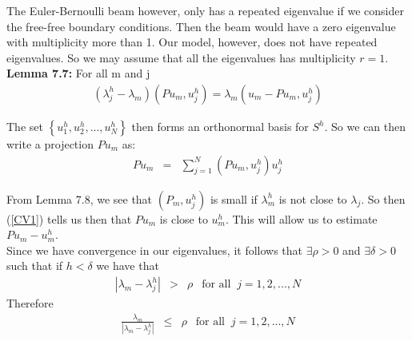 \documentclass[../../main.tex]{subfiles}
\begin{document}
The Euler-Bernoulli beam however, only has a repeated eigenvalue if we consider the free-free boundary conditions. Then the beam would have a zero eigenvalue with multiplicity more than 1. Our model, however, does not have repeated eigenvalues. So we may assume that all the eigenvalues has multiplicity $r=1$.\\


\textbf{Lemma 7.7:} For all m and j
\begin{eqnarray*}
(\lambda_{j}^{h} - \lambda_{m}) ( Pu_{m}, u_{j}^{h}) = \lambda_{m} ( u_{m}-Pu_{m},u_{j}^{h} )
\end{eqnarray*}

\begin{comment}
\textbf{Proof:}
Since the term $\lambda_{m}( Pu,u^{h}_{j})$ appears on both sides of the equation, it is only required to show that
\begin{eqnarray*}
\lambda_{j}^{h}( Pu, u_{j}^{h} ) &=& \lambda_{m} ( u, u_{j}^{h} )
\end{eqnarray*}
Now
\begin{eqnarray*}
\lambda_{j}^{h}( Pu, u_{j}^{h} ) &=& b(Pu,u_{j}^{h})\\
\lambda_{m} ( u, u_{j}^{h} ) &=& b(u,u_{j}^{h})
\end{eqnarray*} Since $u$ and $u_{j}^{h}$ are both eigenfunctions.\\


Then equality follows from the definitions of the projection P.
\qed
\end{comment}

The set $\left\{u_{1}^{h},u_{2}^{h},...,u_{N}^{h}\right\}$ then forms an orthonormal basis for $S^{h}$. So we can then write a projection $Pu_{m}$ as:
\begin{eqnarray}
Pu_{m} &=& \sum_{j=1}^{N} ( P u_{m} ,u_{j}^{h}) u_{j}^{h} \label{CV1}
\end{eqnarray}


From Lemma 7.8, we see that $( P_{m},u_{j}^{h} )$ is small if $\lambda_{m}^{h}$ is not close to $\lambda_{j}$. So then (\ref{CV1}) tells us then that $Pu_{m}$ is close to $u_{m}^{h}$. This will allow us to estimate $Pu_{m} - u_{m}^{h}$.\\


Since we have convergence in our eigenvalues, it follows that $\exists \rho > 0$ and $\exists \delta > 0$ such that if $h<\delta$ we have that
\begin{eqnarray}
|\lambda_{m} - \lambda_{j}^{h}| &>& \rho \ \ \textrm{ for all } \ j = 1,2,...,N
\end{eqnarray}
Therefore
\begin{eqnarray}
\frac{\lambda_{m}}{|\lambda_{m} - \lambda_{j}^{h}|} &\leq & \rho \ \ \textrm{ for all } \ j = 1,2,...,N
\end{eqnarray}
\end{document}
